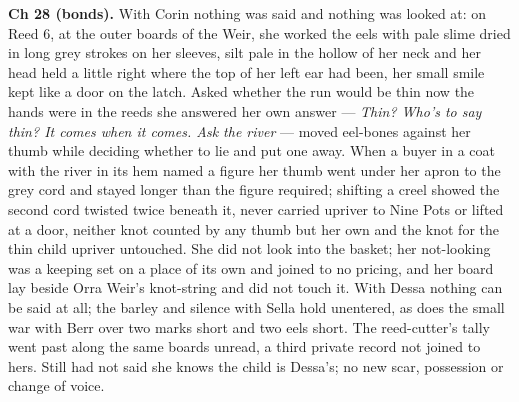 \documentclass{design/chronicle}
\begin{document}
{\textbf{Ch 28 (bonds).} With Corin nothing was said and nothing was looked at: on Reed 6, at the outer boards of the Weir, she worked the eels with pale slime dried in long grey strokes on her sleeves, silt pale in the hollow of her neck and her head held a little right where the top of her left ear had been, her small smile kept like a door on the latch. Asked whether the run would be thin now the hands were in the reeds she answered her own answer — \emph{Thin? Who’s to say thin? It comes when it comes. Ask the river} — moved eel-bones against her thumb while deciding whether to lie and put one away. When a buyer in a coat with the river in its hem named a figure her thumb went under her apron to the grey cord and stayed longer than the figure required; shifting a creel showed the second cord twisted twice beneath it, never carried upriver to Nine Pots or lifted at a door, neither knot counted by any thumb but her own and the knot for the thin child upriver untouched. She did not look into the basket; her not-looking was a keeping set on a place of its own and joined to no pricing, and her board lay beside Orra Weir’s knot-string and did not touch it. With Dessa nothing can be said at all; the barley and silence with Sella hold unentered, as does the small war with Berr over two marks short and two eels short. The reed-cutter’s tally went past along the same boards unread, a third private record not joined to hers. Still had not said she knows the child is Dessa’s; no new scar, possession or change of voice.

}
\end{document}
